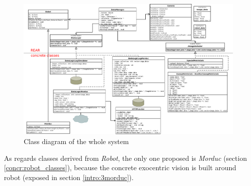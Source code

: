 {
\begin{figure}[!h]
  \begin{center}
    \includegraphics[width=\textheight, angle=270]{img/class_diagram.png} 
    \caption{Class diagram of the whole system}
    \label{fig:class_diagram_complete}
  \end{center}
\end{figure}
}

As regards classes derived from \textit{Robot}, the only one proposed
is \textit{Morduc} (section \ref{concr:robot_classes}), because
the concrete \framework{} exocentric vision
is built around \morduc{} robot (exposed in section \ref{intro:3morduc}).

\clearpage

\clearpage

\clearpage

